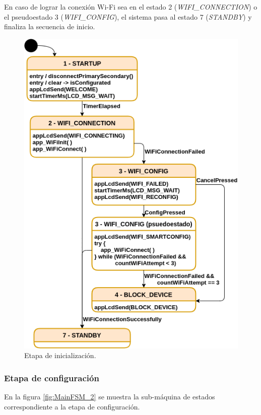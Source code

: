 En caso de lograr la conexión Wi-Fi sea en el estado 2 (\textit{WIFI\_CONNECTION}) o el pseudoestado 3 (\textit{WIFI\_CONFIG}), el sistema pasa al estado 7 (\textit{STANDBY}) y finaliza la secuencia de inicio.

\pagebreak

\begin{figure}[ht]
	\centering
	\includegraphics[scale=1]{./Figures/MainFSM_1.png}
	\caption{Etapa de inicialización.}
	\label{fig:MainFSM_1}
\end{figure}


\subsubsection{Etapa de configuración}
\label{subsubsec:EtConf}
En la figura \ref{fig:MainFSM_2} se muestra la sub-máquina de estados correspondiente a la etapa de configuración. 


